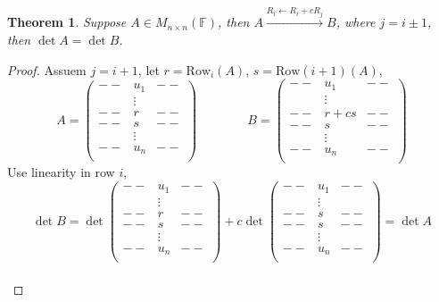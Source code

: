 \documentclass[12pt]{article}
\theoremstyle{plain}
\newtheorem{theorem}{Theorem}[subsection]
\newcommand{\Row}{\mathrm{Row}}
\newcommand{\mF}{{\mathbb{F}}}
\begin{document}
\begin{theorem}
	Suppose $A \in M_{n\times n} (\mF)$, then $A \overset{R_i \leftarrow R_i + 
	cR_j}{\longrightarrow} B$, where $j = i \pm 1$, then $\det A = \det B$. 
\end{theorem}
\begin{proof}
	Assuem $j = i +1$, let $r = \Row_i(A)$, $s = \Row(i+1)(A)$, 
	\[
		A = 
		\begin{pmatrix}
			--	& u_1 &	--	\\
				& \vdots &	\\
			--	& r &	--	\\
			--	& s &	--	\\ 
				& \vdots &	\\
			--	& u_n &	--	\\
		\end{pmatrix}
	\qquad \qquad 
		B=\begin{pmatrix}
			--	& u_1 &	--	\\
				& \vdots &	\\
			--	& r+cs &	--	\\
			--	& s &	--	\\ 
				& \vdots &	\\
			--	& u_n &	--	\\
		\end{pmatrix}
	\]
	Use linearity in row $i$, 
	\[
		\det B = \det \begin{pmatrix}
			--	& u_1 &	--	\\
				& \vdots &	\\
			--	& r &	--	\\
			--	& s &	--	\\ 
				& \vdots &	\\
			--	& u_n &	--	\\
		\end{pmatrix}
		+ c\det \begin{pmatrix}
			--	& u_1 &	--	\\
				& \vdots &	\\
			--	& s &	--	\\
			--	& s &	--	\\ 
				& \vdots &	\\
			--	& u_n &	--	\\
		\end{pmatrix}
		= \det A
	\]	\\
\end{proof}
\end{document}

